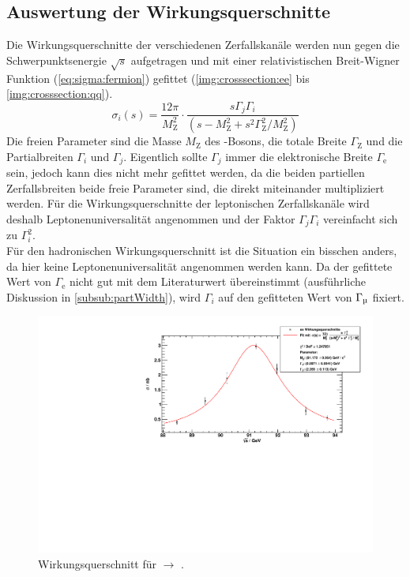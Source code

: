 \subsection{Auswertung der Wirkungsquerschnitte}
Die Wirkungsquerschnitte der verschiedenen Zerfallskanäle werden nun gegen die Schwerpunktsenergie $\sqrt{s}$ aufgetragen und mit einer 
relativistischen Breit-Wigner Funktion (\autoref{eq:sigma:fermion}) gefittet (\autoref{img:crosssection:ee} bis \autoref{img:crosssection:qq}).
\begin{equation}
    \sigma_i(s) = \frac{12 \pi}{M_\text{Z}^2} \cdot \frac{s \Gamma_j \Gamma_i}{ \left( s - M_\text{Z}^2 + s^2 \Gamma_\text{Z}^2 / M_\text{Z}^2 \right) }
\end{equation}
Die freien Parameter sind die Masse $M_\text{Z}$ des \Z-Bosons, die totale Breite $\Gamma_\text{Z}$ und 
die Partialbreiten $\Gamma_i$ und $\Gamma_j$. Eigentlich sollte $\Gamma_j$ immer die elektronische Breite $\Gamma_\text{e}$ sein, jedoch 
kann dies nicht mehr gefittet werden, da die beiden partiellen Zerfallsbreiten beide freie Parameter sind, die direkt miteinander multipliziert 
werden. Für die Wirkungsquerschnitte der leptonischen Zerfallskanäle wird deshalb Leptonenuniversalität angenommen und der Faktor $\Gamma_j \Gamma_i$ 
vereinfacht sich zu $\Gamma_i^2$. \\
Für den hadronischen Wirkungsquerschnitt ist die Situation ein bisschen anders, da hier keine Leptonenuniversalität angenommen werden kann. 
Da der gefittete Wert von $\Gamma_\text{e}$ nicht gut mit dem Literaturwert übereinstimmt (ausführliche Diskussion in \autoref{subsub:partWidth}), 
wird $\Gamma_i$ auf den gefitteten Wert von $\Gamma_\text{\textmu}$ fixiert.

\begin{figure}[H]
    \begin{center}
        \includegraphics[width=\textwidth]{../img/crosssections_ee.pdf}
        \caption{Wirkungsquerschnitt für \ee $\to$ \ee.}
        \label{img:crosssection:ee}
    \end{center}
\end{figure}

